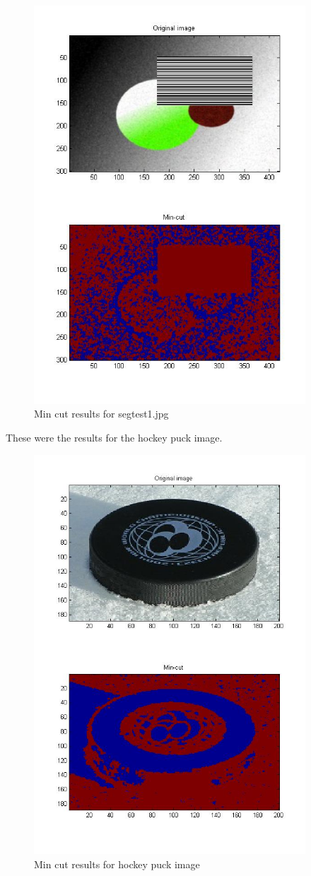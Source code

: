 \documentclass[11pt,psfig]{article}
\begin{document}
\begin{figure}[H]
\centering
\includegraphics[width=4in]{prob5plotB_2.jpg}
\caption{Min cut results for segtest1.jpg}
\end{figure}

These were the results for the hockey puck image. 

\begin{figure}[H]
\centering
\includegraphics[width=4in]{prob5plotB_3.jpg}
\caption{Min cut results for hockey puck image}
\end{figure}
\end{document}
